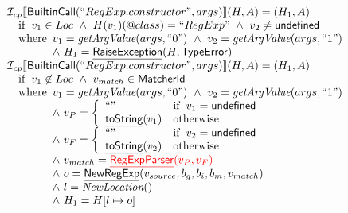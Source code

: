 \[\begin{array}{l}
\I_{cp}\lbr \SF{BuiltinCall}(``RegExp.constructor", args)\rbr(H,A)
= (H_1, A)\\
\quad\ifc{
  v_{1} \in Loc ~\land~ H(v_{1})(\varprop{class}) = ``RegExp" ~\land~ v_{2} \neq \SF{undefined}
 }\\
\quad\wherec{
  v_{1} = \hf{getArgValue}(args, ``0") ~\land~  v_{2} = \hf{getArgValue}(args, ``1")\\
  \land~ H_1 = \chf{RaiseException}(H, \exc{TypeError})
}\\

\I_{cp}\lbr \SF{BuiltinCall}(``RegExp.constructor", args)\rbr(H,A)
 = (H_1, A)\\
 \quad\ifc{v_{1} \not\in Loc
  ~\land~ v_{match} \in \matcher\\
}\\
\quad\wherec{
  v_{1} = \hf{getArgValue}(args, ``0") ~\land~  v_{2} = \hf{getArgValue}(args, ``1")\\
  \land~ v_P = \left\{
    \begin{array}{ll}
      ``" & \ifc{v_{1} = \SF{undefined}} \\
      \chf{toString}(v_{1}) & \owc %
    \end{array}
  \right.\\
  \land~ v_F = \left\{
    \begin{array}{ll}
      ``" & \ifc{v_{2} = \SF{undefined}} \\
      \chf{toString}(v_{2}) & \owc
    \end{array}
  \right.\\
  \land~ v_{match} = {\inred\chf{RegExpParser}(v_{P}, v_{F})}\\
  \land~ o = \chf{NewRegExp}(v_{source}, b_{g}, b_{i}, b_{m}, v_{match})\\
  \land~ l=\hf{NewLocation}()\\
  \land~ H_1 = H[l\mapsto o]
}\\


\end{array}\]
